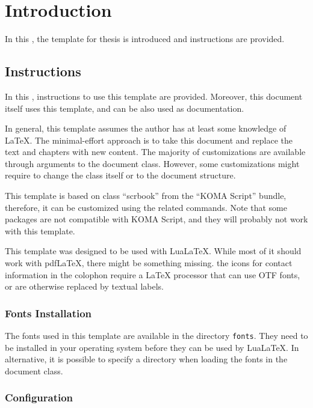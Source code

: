 
\chapter{Introduction}
\label{chap:introduction}

In this , the template for \phd thesis is introduced and instructions are provided.


\section{Instructions}
\label{sec:introduction:instructions}

In this , instructions to use this template are provided.
Moreover, this document itself uses this template, and can be also used as documentation.

In general, this template assumes the author has at least some knowledge of \LaTeX{}.
The minimal-effort approach is to take this document and replace the text and chapters with new content.
The majority of customizations are available through arguments to the document class.
However, some customizations might require to change the class itself or to the document structure.

This template is based on class \enquote{scrbook} from the \enquote{KOMA Script} bundle, therefore, it can be customized using the related commands.
Note that some packages are not compatible with KOMA Script, and they will probably not work with this template.

This template was designed to be used with Lua\LaTeX{}.
While most of it should work with pdf\LaTeX{}, there might be something missing.
\Eg the icons for contact information in the colophon require a \LaTeX{} processor that can use OTF fonts, or are otherwise replaced by textual labels.


\subsection{Fonts Installation}

The fonts used in this template are available in the directory \texttt{fonts}.
They need to be installed in your operating system before they can be used by Lua\LaTeX{}.
In alternative, it is possible to specify a directory when loading the fonts in the document class.


\subsection{Configuration}

